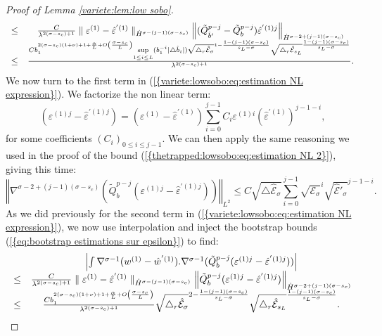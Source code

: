 \documentclass[11pt,a4paper,reqno]{amsart}
\theoremstyle{remark}
\numberwithin{equation}{section}
\begin{document}
\begin{proof}[Proof of Lemma \ref{variete:lem:low sobo}]
\begin{equation}
\begin{array}{r c l}
\leq & \frac{C}{\lambda^{2(\sigma-s_c)+1}}\parallel \varepsilon^{(1)}-\hat{\varepsilon}^{'(1)}\parallel_{\dot{H}^{\sigma-(j-1)(\sigma-s_c)}}\left\Vert (\tilde{Q}_{\hat{b}'}^{p-j}-\tilde{Q}_b^{p-j})\hat{\varepsilon}^{'(1)j} \right\Vert_{\dot{H}^{\sigma-2+(j-1)(\sigma-s_c)}}\\
\leq & \frac{Cb_1^{2(\sigma-s_c)(1+\nu)+1+\frac{\alpha}{L}+O\left(\frac{\sigma-s_c}{L} \right)}\underset{1\leq i \leq L}{\text{sup}}(b_1^{-i}|\triangle \hat{b}_i|)\sqrt{\triangle _r \hat{\mathcal{E}}_{\sigma}}^{1-\frac{1-(j-1)(\sigma-s_c)}{s_L-\sigma}}\sqrt{\triangle _r \hat{\mathcal{E}}_{s_L}}^{\frac{1-(j-1)(\sigma-s_c)}{s_L-\sigma}}}{\lambda^{2(\sigma-s_c)+1}} .\\
\end{array}
\end{equation}
We now turn to the first term in {{\rm (\ref{{variete:lowsobo:eq:estimation NL expression}})}}. We factorize the non linear term:
$$
(\varepsilon^{(1)j}-\hat{\varepsilon}^{'(1)j})=(\varepsilon^{(1)}-\hat{\varepsilon}^{'(1)})\sum_{i=0}^{j-1}C_i \varepsilon^{(1)i} (\hat{\varepsilon}^{'(1)})^{j-1-i},
$$
for some coefficients $(C_i)_{0\leq i \leq j-1}$. We can then apply the same reasoning we used in the proof of the bound {{\rm (\ref{{thetrapped:lowsobo:eq:estimation NL 2}})}}, giving this time:
$$
\left\Vert \nabla^{\sigma-2+(j-1)(\sigma-s_c)}(\tilde{Q}_{b}^{p-j}(\varepsilon^{(1)j}-\hat{\varepsilon}^{'(1)j})) \right\Vert_{L^2} \leq  C \sqrt{\triangle \hat{\mathcal{E}}_{\sigma}} \sum_{i=0}^{j-1} \sqrt{\mathcal{E}_{\sigma}}^{i} \sqrt{\hat{\mathcal{E}}'_{\sigma}}^{j-1-i} .
$$
As we did previously for the second term in {{\rm (\ref{{variete:lowsobo:eq:estimation NL expression}})}}, we now use interpolation and inject the bootstrap bounds {{\rm (\ref{{eq:bootstrap estimations sur epsilon}})}} to find:
\begin{equation} \label{variete:lowsobo:eq:estimation NL 2}
\begin{array}{r c l}
&\left| \int \nabla^{\sigma-1}(w^{(1)}-\hat{w}^{'(1)}).\nabla^{\sigma-1}(\tilde{Q}_{b}^{p-j}(\varepsilon^{(1)j}- \hat{\varepsilon}^{'(1)j} )) \right| \\
\leq & \frac{C}{\lambda^{2(\sigma-s_c)+1}}\parallel \varepsilon^{(1)}-\hat{\varepsilon}^{'(1)} \parallel_{\dot{H}^{\sigma-(j-1)(\sigma-s_c)}}\left\Vert \tilde{Q}_b^{p-j}(\varepsilon^{(1)j}-\hat{\varepsilon}^{'(1)j}) \right\Vert_{\dot{H}^{\sigma-2+(j-1)(\sigma-s_c)}}\\
\leq & \frac{Cb_1^{2(\sigma-s_c)(1+\nu)+1+\frac{\alpha}{L}+O\left(\frac{\sigma-s_c}{L} \right)}}{\lambda^{2(\sigma-s_c)+1}} \sqrt{\triangle _r \hat{\mathcal{E}}_{\sigma}}^{2-\frac{1-(j-1)(\sigma-s_c)}{s_L-\sigma}}\sqrt{\triangle _r \hat{\mathcal{E}}_{s_L}}^{\frac{1-(j-1)(\sigma-s_c)}{s_L-\sigma}}.\\

\end{array}
\end{equation}
\end{proof}
\end{document}
